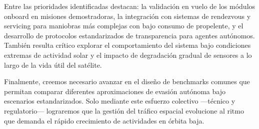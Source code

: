 Entre las prioridades identificadas destacan: la validación en vuelo de los módulos onboard en misiones demostradoras, la integración con sistemas de rendezvous y servicing para maniobras más complejas con bajo consumo de propelente, y el desarrollo de protocolos estandarizados de transparencia para agentes autónomos. También resulta crítico explorar el comportamiento del sistema bajo condiciones extremas de actividad solar y el impacto de degradación gradual de sensores a lo largo de la vida útil del satélite.

Finalmente, creemos necesario avanzar en el diseño de benchmarks comunes que permitan comparar diferentes aproximaciones de evasión autónoma bajo escenarios estandarizados. Solo mediante este esfuerzo colectivo —técnico y regulatorio— lograremos que la gestión del tráfico espacial evolucione al ritmo que demanda el rápido crecimiento de actividades en órbita baja.
